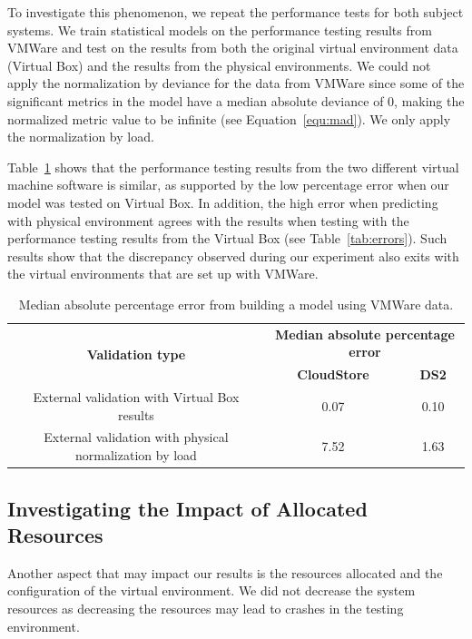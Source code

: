 \documentclass[smallextended]{svjour3}       %
\begin{document}
To investigate this phenomenon, we repeat the performance tests for both subject systems. We train statistical models on the performance testing results from VMWare and test on the results from both the original virtual environment data (Virtual Box) and the results from the physical environments. We could not apply the normalization by deviance for the data from VMWare since some of the significant metrics in the model have a median absolute deviance of 0, making the normalized metric value to be infinite (see Equation~\ref{equ:mad}). We only apply the normalization by load. 

Table~\ref{tab:vmware} shows that the performance testing results from the two different virtual machine software is similar, as supported by the low percentage error when our model was tested on Virtual Box. In addition, the high error when predicting with physical environment agrees with the results when testing with the performance testing results from the Virtual Box (see Table~\ref{tab:errors}). Such results show that the discrepancy observed during our experiment also exits with the virtual environments that are set up with VMWare.

\begin{table}[tbh]
	\centering
	\caption{Median absolute percentage error from building a model using VMWare data.}
	\label{tab:vmware}
	\begin{tabular}{|c||c|c|}
		\hline
		\multirow{2}{*}{\textbf{Validation type}} & \multicolumn{2}{c|}{\textbf{Median absolute percentage error}} \\ \cline{2-3} 
		& \textbf{CloudStore} & \textbf{DS2} \\ %
		\midrule
		\midrule
		External validation with Virtual Box results& 0.07&0.10\\ \hline
		External validation with physical normalization by load & 7.52& 1.63 \\ \hline
	\end{tabular}
\end{table}

\subsection{Investigating the Impact of Allocated Resources}

Another aspect that may impact our results is the resources allocated and the configuration of the virtual environment. We did not decrease the system resources as decreasing the resources may lead to crashes in the testing environment.
\end{document}
